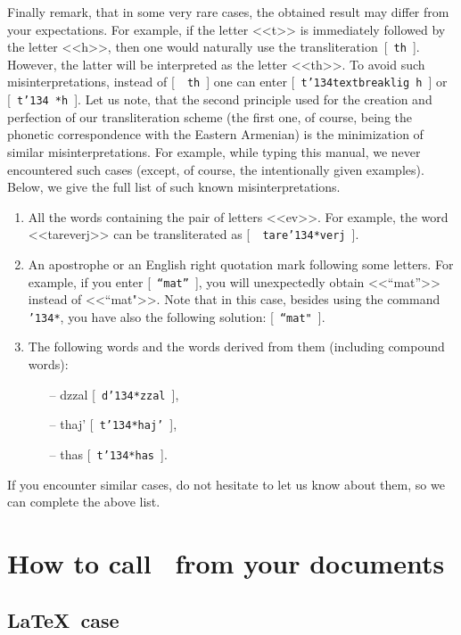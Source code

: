 \documentclass[12pt,a4paper,draft]{article}
\def\mybs{\char'134}
\begin{document}
Finally remark, that in some very rare cases, the obtained result may differ
from your expectations. For example, if the letter {\artm <<t>>} is
immediately followed by the letter {\artm <<h>>}, then one would naturally use
the transliteration~[~{\tt th}~].  However, the latter will be interpreted as
the letter {\artm <<th>>}. To avoid such misinterpretations, instead of [~{\tt
    th}~] one can enter [~{\tt t\mybs textbreaklig h}~] or [~{\tt t\mybs
    *h}~]. Let us note, that the second principle used for the creation and
perfection of our transliteration scheme (the first one, of course, being the
phonetic correspondence with the Eastern Armenian) is the minimization of
similar misinterpretations. For example, while typing this manual, we never
encountered such cases (except, of course, the intentionally given
examples). Below, we give the full list of such known misinterpretations.
%
\begin{enumerate}
%
\item All the words containing the pair of letters {\artm <<e\*v>>}. For
  example, the word {\artm <<tare\*verj>>} can be transliterated as [~{\tt
      tare\mybs *verj}~].
%
\item An apostrophe or an English right quotation mark following some
  letters. For example, if you enter [~{\tt ``mat''}~], you will unexpectedly
  obtain {\artm <<``mat''>>} instead of {\artm <<``mat">>}. Note that in this
  case, besides using the command {\tt \mybs *}, you have also the following
  solution: [~{\tt ``mat"}~].
%
\item The following words and the words derived from them (including compound
  words):
\begin{itemize}
\item[--]{\artm d\*zzal} [~{\tt d\mybs *zzal}~],
\item[--]{\artm t\*haj'} [~{\tt t\mybs *haj'}~],
\item[--]{\artm t\*has} [~{\tt t\mybs *has}~].
\end{itemize}
%
\end{enumerate}
%
If you encounter similar cases, do not hesitate to let us know about them, so
we can complete the above list.


\section{How to call \latArmTeX\ from your documents}
\subsection{\LaTeX\ case}
\label{lload}
\end{document}
